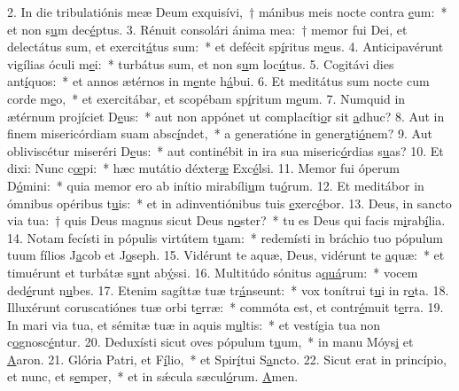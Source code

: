 2. In die tribulatiónis meæ Deum exquisívi,~† mánibus meis nocte contra \uline{e}um:~* et non s\uline{u}m dec\uline{é}ptus.
3. Rénuit consolári ánima mea:~† memor fui Dei, et delectátus sum, et exercit\uline{á}tus sum:~* et defécit sp\uline{í}ritus m\uline{e}us.
4. Anticipavérunt vigílias óculi m\uline{e}i:~* turbátus sum, et non s\uline{u}m loc\uline{ú}tus.
5. Cogitávi dies ant\uline{í}quos:~* et annos ætérnos in m\uline{e}nte h\uline{á}bui.
6. Et meditátus sum nocte cum corde m\uline{e}o,~* et exercitábar, et scopébam sp\uline{í}ritum m\uline{e}um.
7. Numquid in ætérnum projíciet D\uline{e}us:~* aut non appónet ut complacíti\uline{o}r sit \uline{a}dhuc?
8. Aut in finem misericórdiam suam absc\uline{í}ndet,~* a generatióne in gener\uline{a}ti\uline{ó}nem?
9. Aut obliviscétur miseréri D\uline{e}us:~* aut continébit in ira sua miseric\uline{ó}rdias s\uline{u}as?
10. Et dixi: Nunc c\uline{œ}pi:~* hæc mutátio déxter\uline{æ} Exc\uline{é}lsi.
11. Memor fui óperum D\uline{ó}mini:~* quia memor ero ab inítio mirabíli\uline{u}m tu\uline{ó}rum.
12. Et meditábor in ómnibus opéribus t\uline{u}is:~* et in adinventiónibus tuis \uline{e}xerc\uline{é}bor.
13. Deus, in sancto via tua:~† quis Deus magnus sicut Deus n\uline{o}ster?~* tu es Deus qui facis m\uline{i}rab\uline{í}lia.
14. Notam fecísti in pópulis virtútem t\uline{u}am:~* redemísti in bráchio tuo pópulum tuum fílios J\uline{a}cob et J\uline{o}seph.
15. Vidérunt te aquæ, Deus, vidérunt te \uline{a}quæ:~* et timuérunt et turbátæ s\uline{u}nt ab\uline{ý}ssi.
16. Multitúdo sónitus a\uline{quá}rum:~* vocem ded\uline{é}runt n\uline{u}bes.
17. Etenim sagíttæ tuæ tr\uline{á}nseunt:~* vox tonítrui t\uline{u}i in r\uline{o}ta.
18. Illuxérunt coruscatiónes tuæ orbi t\uline{e}rræ:~* commóta est, et contr\uline{é}muit t\uline{e}rra.
19. In mari via tua, et sémitæ tuæ in aquis m\uline{u}ltis:~* et vestígia tua non c\uline{o}gnosc\uline{é}ntur.
20. Deduxísti sicut oves pópulum t\uline{u}um,~* in manu Móys\uline{i} et \uline{A}aron.
21. Glória Patri, et F\uline{í}lio,~* et Spir\uline{í}tui S\uline{a}ncto.
22. Sicut erat in princípio, et nunc, et s\uline{e}mper,~* et in sǽcula sæcul\uline{ó}rum. \uline{A}men.
